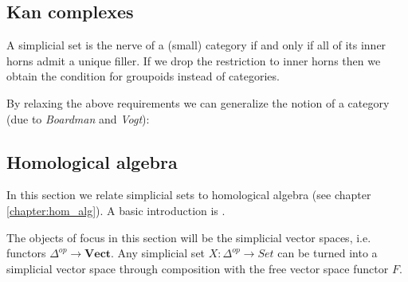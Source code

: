 \subsection{Kan complexes}



    \begin{property}
        A simplicial set is the nerve of a (small) category if and only if all of its inner horns admit a unique filler. If we drop the restriction to inner horns then we obtain the condition for groupoids instead of categories.
    \end{property}

    By relaxing the above requirements we can generalize the notion of a category (due to \textit{Boardman} and \textit{Vogt}):

\subsection{Homological algebra}

    In this section we relate simplicial sets to homological algebra (see chapter \ref{chapter:hom_alg}). A basic introduction is \cite{master2020homology}.

    The objects of focus in this section will be the simplicial vector spaces, i.e. functors $\Delta^{op}\rightarrow\mathbf{Vect}$. Any simplicial set $X:\Delta^{op}\rightarrow Set$ can be turned into a simplicial vector space through composition with the free vector space functor $F$.

